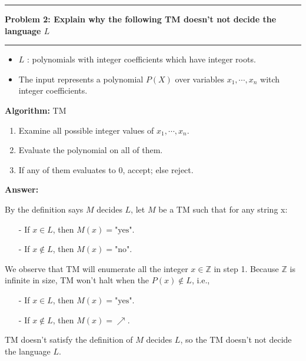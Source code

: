 \documentclass[11pt]{article}
\newcommand\question[2]{\vspace{.25in}\hrule\textbf{#1: #2}\vspace{.5em}\hrule\vspace{.10in}}
\renewcommand\part[1]{\vspace{.10in}\textbf{#1}}
\newcommand\algorithm{\vspace{.10in}\textbf{Algorithm: }}
\newcommand\correctness{\vspace{.10in}\textbf{Correctness: }}
\newcommand\runtime{\vspace{.10in}\textbf{Running time: }}
\begin{document}



\question{Problem 2}{Explain why the following TM doesn't not decide the language $L$}

\begin{itemize}
\item
$L$ : polynomials with integer coefficients which have integer roots.
\item
The input represents a polynomial $P(X)$ over variables $x_1, \cdots, x_n$ witch integer coefficients.
\end{itemize}

\algorithm TM
\begin{enumerate}
  \item Examine all possible integer values of $x_1, \cdots, x_n$.
  \item Evaluate the polynomial on all of them.
  \item If any of them evaluates to 0, accept; else reject.
\end{enumerate}

\part{Answer:}

By the definition says $M$ decides $L$, let $M$ be a TM such that for any string x:
\begin{itemize}
  \item[-] If $x \in L$, then $M(x) = \text{"yes"}$.
  \item[-] If $x \notin L$, then $M(x) = \text{"no"}$.
\end{itemize}


We observe that TM will enumerate all the integer $x \in \mathbb{Z}$ in step 1. Because $\mathbb{Z}$ is infinite in size, TM won't halt when the $P(x) \notin L$, i.e.,
\begin{itemize}
  \item[-] If $x \in L$, then $M(x) = \text{"yes"}$.
  \item[-] If $x \notin L$, then $M(x) = \nearrow$.
\end{itemize}

TM doesn't satisfy the definition of $M$ decides $L$, so the TM doesn't not decide the language $L$.
\end{document}
